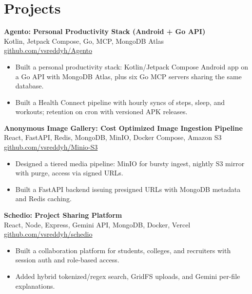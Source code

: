 \documentclass[a4paper,11pt]{article}
\newcommand{\resumeItem}[1]{\item \small{#1}}
\newcommand{\resumeSubheading}[4]{%
  \textbf{#1} \hfill \textbf{#2} \\
{#3} \hfill {#4}
}
\newcommand{\resumeSubHeadingListStart}{\begin{itemize}}
\newcommand{\resumeSubHeadingListEnd}{\end{itemize}}
\begin{document}
\section*{Projects}

\resumeSubheading
{Agento: Personal Productivity Stack (Android + Go API)}{}{Kotlin, Jetpack Compose, Go, MCP, MongoDB Atlas}{\href{https://github.com/vsreddyh/Agento}{github.com/vsreddyh/Agento}}
\resumeSubHeadingListStart
\resumeItem{Built a personal productivity stack: Kotlin/Jetpack Compose Android app on a Go API with MongoDB Atlas, plus six Go MCP servers sharing the same database.}
\resumeItem{Built a Health Connect pipeline with hourly syncs of steps, sleep, and workouts; retention on cron with versioned APK releases.}
\resumeSubHeadingListEnd

\resumeSubheading
{Anonymous Image Gallery: Cost Optimized Image Ingestion Pipeline}{}{React, FastAPI, Redis, MongoDB, MinIO, Docker Compose, Amazon S3}{\href{https://github.com/vsreddyh/Minio-S3}{github.com/vsreddyh/Minio-S3}}
\resumeSubHeadingListStart
\resumeItem{Designed a tiered media pipeline: MinIO for bursty ingest, nightly S3 mirror with purge, access via signed URLs.}
\resumeItem{Built a FastAPI backend issuing presigned URLs with MongoDB metadata and Redis caching.}
\resumeSubHeadingListEnd

\resumeSubheading
{Schedio: Project Sharing Platform}{}{React, Node, Express, Gemini API, MongoDB, Docker, Vercel}{\href{https://github.com/vsreddyh/schedio}{github.com/vsreddyh/schedio}}
\resumeSubHeadingListStart
\resumeItem{Built a collaboration platform for students, colleges, and recruiters with session auth and role-based access.}
\resumeItem{Added hybrid tokenized/regex search, GridFS uploads, and Gemini per-file explanations.}
\resumeSubHeadingListEnd


\vspace{-0.6em}
\end{document}
